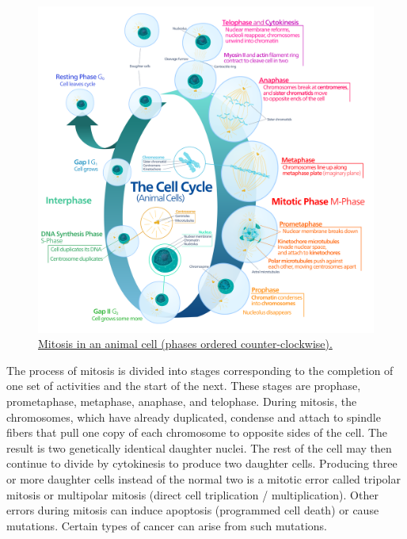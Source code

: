 \begin{figure}

{\centering \includegraphics[width=0.7\linewidth]{./figures/reproduction/Animal_cell_cycle-en} 

}

\caption{\href{https://commons.wikimedia.org/wiki/File:Animal_cell_cycle-en.svg}{Mitosis in an animal cell (phases ordered counter-clockwise).}}\label{fig:cellcyclefigure}
\end{figure}

The process of mitosis is divided into stages corresponding to the completion of one set of activities and the start of the next. These stages are prophase, prometaphase, metaphase, anaphase, and telophase. During mitosis, the chromosomes, which have already duplicated, condense and attach to spindle fibers that pull one copy of each chromosome to opposite sides of the cell. The result is two genetically identical daughter nuclei. The rest of the cell may then continue to divide by cytokinesis to produce two daughter cells. Producing three or more daughter cells instead of the normal two is a mitotic error called tripolar mitosis or multipolar mitosis (direct cell triplication / multiplication). Other errors during mitosis can induce apoptosis (programmed cell death) or cause mutations. Certain types of cancer can arise from such mutations.



